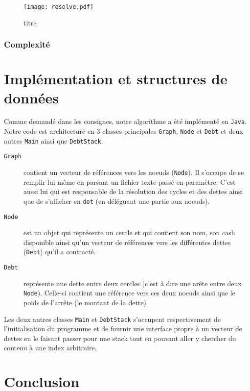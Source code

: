 \documentclass[12pt, oneside]{article}
\begin{document}
\begin{figure}[h]
   \caption{\label{resolve} titre}
   \begin{center}
   \texttt{[image: resolve.pdf]}
   \end{center}
\end{figure}
\subsubsection{Complexité}

\section{Implémentation et structures de données}
Comme demandé dans les consignes, notre algorithme a été implémenté en \texttt{Java}. Notre code est architecturé en 3 classes principales \texttt{Graph}, \texttt{Node} et \texttt{Debt} et deux autres \texttt{Main} ainsi que \texttt{DebtStack}.

\begin{description}
\item[\texttt{Graph}] contient un vecteur de références vers les noeuds (\texttt{Node}). Il s'occupe de se remplir lui même en parsant un fichier texte passé en paramètre. C'est aussi lui qui est responsable de la résolution des cycles et des dettes ainsi que de s'afficher en \texttt{dot} (en déléguant une partie aux noeuds).
\item[\texttt{Node}] est un objet qui représente un cercle et qui contient son nom, son cash disponible ainsi qu'un vecteur de références vers les différentes dettes 
(\texttt{Debt}) qu'il a contracté.
\item[\texttt{Debt}] représente une dette entre deux cercles (c'est à dire une arête entre deux \texttt{Node}). Celle-ci contient une référence vers ces deux noeuds ainsi que le poids de l'arrête (le montant de la dette)
\end{description}
Les deux autres classes \texttt{Main} et \texttt{DebtStack} s'occupent respectivement de l'initialisation du programme et de fournir une interface propre à un vecteur de dettes en le faisant passer pour une stack tout en pouvant aller y chercher du contenu à une index arbitraire.

\section{Conclusion}
\end{document}

